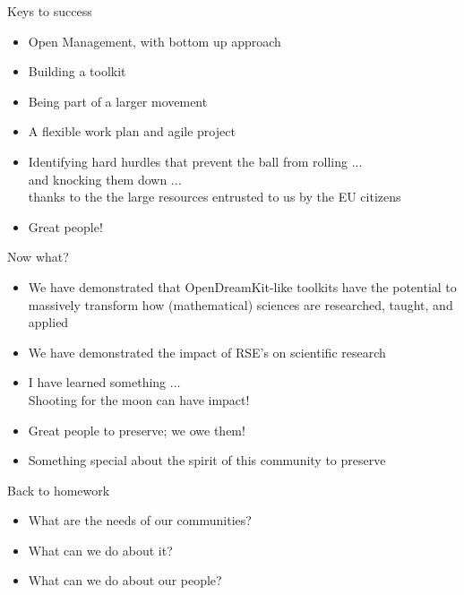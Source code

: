 \documentclass[svgnames]{beamer}
\begin{document}
\begin{frame}{Keys to success}\pause
  \begin{itemize}
  \item Open Management, with bottom up approach\pause
  \item Building a toolkit\pause
  \item Being part of a larger movement\pause
  \item A flexible work plan and agile project\pause
  \item Identifying hard hurdles that prevent the ball from rolling
    ...\\\pause
    and knocking them down ...\\\pause
    thanks to the the large resources entrusted to us by the EU
    citizens\pause\medskip
  \item Great people!
  \end{itemize}
\end{frame}

\begin{frame}{Now what?}
    \begin{itemize}
    \item We have demonstrated that OpenDreamKit-like toolkits have the
      potential to massively transform how (mathematical) sciences are
      researched, taught, and applied \pause
    \item We have demonstrated the impact of RSE's on scientific research
      \pause
    \item I have learned something ...\\\pause
      Shooting for the moon can have impact!
      \bigskip\pause
    \item Great people to preserve; we owe them! \pause
    \item Something special about the spirit of this community to preserve
    \end{itemize}
  \pause\bigskip

  \begin{block}{Back to homework}
    \begin{itemize}
    \item What are the needs of our communities?
    \item What can we do about it?
    \item What can we do about our people?
    \end{itemize}
  \end{block}
\end{frame}
\end{document}
